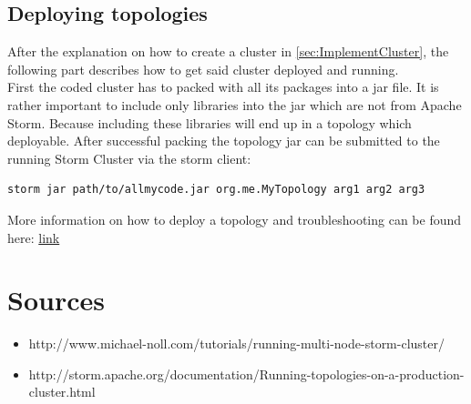 \documentclass[12pt,a4paper]{article}
\begin{document}
\subsection{Deploying topologies}
After the explanation on how to create a cluster in \ref{sec:ImplementCluster}, the following part describes how to get said cluster deployed and running.\\
First the coded cluster has to packed with all its packages into a jar file. It is rather important to include only libraries into the jar which are not from Apache Storm. Because including these libraries will end up in a topology which deployable. After successful packing the topology jar can be submitted to the running Storm Cluster via the storm client:
\begin{verbatim}
storm jar path/to/allmycode.jar org.me.MyTopology arg1 arg2 arg3
\end{verbatim}
More information on how to deploy a topology and troubleshooting can be found here: \href{http://storm.apache.org/documentation/Running-topologies-on-a-production-cluster.html}{link}
\section{Sources}
\begin{itemize}
\item http://www.michael-noll.com/tutorials/running-multi-node-storm-cluster/
\item http://storm.apache.org/documentation/Running-topologies-on-a-production-cluster.html
\end{itemize}
\end{document}
